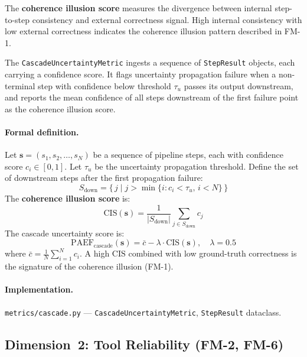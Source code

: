 \documentclass{article}
\begin{document}
The \textbf{coherence illusion score} measures the divergence between
internal step-to-step consistency and external correctness signal.  High
internal consistency with low external correctness indicates the coherence
illusion pattern described in FM-1.

The \texttt{CascadeUncertaintyMetric} ingests a sequence of
\texttt{StepResult} objects, each carrying a confidence score.  It flags
uncertainty propagation failure when a non-terminal step with confidence below
threshold $\tau_u$ passes its output downstream, and reports the mean
confidence of all steps downstream of the first failure point as the coherence
illusion score.

\paragraph{Formal definition.}
Let $\mathbf{s} = (s_1, s_2, \ldots, s_N)$ be a sequence of pipeline steps,
each with confidence score $c_i \in [0,1]$.  Let $\tau_u$ be the uncertainty
propagation threshold.  Define the set of downstream steps after the first
propagation failure:
\begin{equation}
  S_{\text{down}} = \{\, j \mid j > \min\{i : c_i < \tau_u,\, i < N\} \,\}
\end{equation}
The \textbf{coherence illusion score} is:
\begin{equation}
  \text{CIS}(\mathbf{s}) = \frac{1}{|S_{\text{down}}|}
                            \sum_{j \in S_{\text{down}}} c_j
\end{equation}
The cascade uncertainty score is:
\begin{equation}
  \text{PAEF}_{\text{cascade}}(\mathbf{s}) = \bar{c} - \lambda \cdot \text{CIS}(\mathbf{s}),
  \quad \lambda = 0.5
\end{equation}
where $\bar{c} = \frac{1}{N}\sum_{i=1}^{N} c_i$.  A high $\text{CIS}$ combined
with low ground-truth correctness is the signature of the coherence illusion (FM-1).

\begin{sloppypar}\paragraph{Implementation.} \texttt{metrics/cascade.py} ---
\texttt{Cascade\-Uncertainty\-Metric}, \texttt{Step\-Result} dataclass.\end{sloppypar}

\subsection{Dimension~2: Tool Reliability (FM-2, FM-6)}
\end{document}
